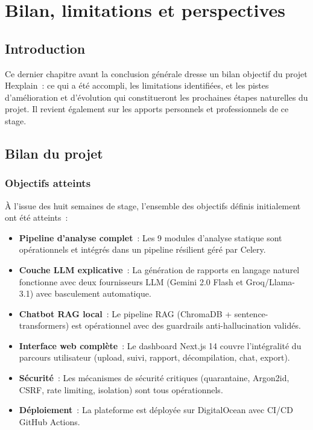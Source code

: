 
\chapter{Bilan, limitations et perspectives}

\section{Introduction}

Ce dernier chapitre avant la conclusion générale dresse un bilan objectif du projet Hexplain~: ce qui a été accompli, les limitations identifiées, et les pistes d'amélioration et d'évolution qui constitueront les prochaines étapes naturelles du projet. Il revient également sur les apports personnels et professionnels de ce stage.

\section{Bilan du projet}

\subsection{Objectifs atteints}

À l'issue des huit semaines de stage, l'ensemble des objectifs définis initialement ont été atteints~:

\begin{itemize}
  \item[\checkmark] \textbf{Pipeline d'analyse complet}~: Les 9 modules d'analyse statique sont opérationnels et intégrés dans un pipeline résilient géré par Celery.
  \item[\checkmark] \textbf{Couche LLM explicative}~: La génération de rapports en langage naturel fonctionne avec deux fournisseurs LLM (Gemini 2.0 Flash et Groq/Llama-3.1) avec basculement automatique.
  \item[\checkmark] \textbf{Chatbot RAG local}~: Le pipeline RAG (ChromaDB + sentence-transformers) est opérationnel avec des guardrails anti-hallucination validés.
  \item[\checkmark] \textbf{Interface web complète}~: Le dashboard Next.js 14 couvre l'intégralité du parcours utilisateur (upload, suivi, rapport, décompilation, chat, export).
  \item[\checkmark] \textbf{Sécurité}~: Les mécanismes de sécurité critiques (quarantaine, Argon2id, CSRF, rate limiting, isolation) sont tous opérationnels.
  \item[\checkmark] \textbf{Déploiement}~: La plateforme est déployée sur DigitalOcean avec CI/CD GitHub Actions.
\end{itemize}

